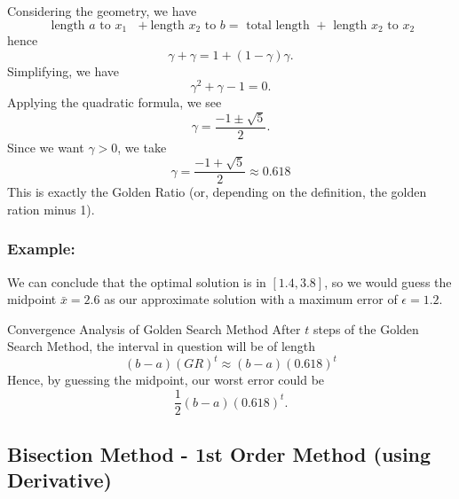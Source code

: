 Considering the geometry, we have
$$
\text{ length $a$ to $x_1$ } + \text{length $x_2$ to $b$} = \text{ total length } + \text{ length $x_2$ to $x_2$}
$$ 
hence
$$
\gamma + \gamma = 1 + (1-\gamma)\gamma.
$$
Simplifying, we have
$$
\gamma^2 + \gamma - 1 = 0.
$$
Applying the quadratic formula, we see
$$
\gamma = \frac{-1 \pm \sqrt{5}}{2}.
$$
Since we want $\gamma > 0$, we take 
$$
\gamma = \frac{-1 + \sqrt{5}}{2} \approx 0.618
$$
This is exactly the Golden Ratio (or, depending on the definition, the golden ration minus 1).



\subsubsection{Example:}

We can conclude that the optimal solution is in $[1.4,3.8]$, so we would guess the midpoint $\bar x = 2.6$ as our approximate solution with a maximum error of $\epsilon = 1.2$.

\begin{general}{Convergence Analysis of Golden Search Method}{}
After $t$ steps of the Golden Search Method, the interval in question will be of length
$$
(b-a)(GR)^t \approx (b-a)(0.618)^t
$$
Hence, by guessing the midpoint, our worst error could be
$$
\frac{1}{2}(b-a)(0.618)^t.
$$
\end{general}






\subsection{Bisection Method - 1st Order Method (using Derivative)}


